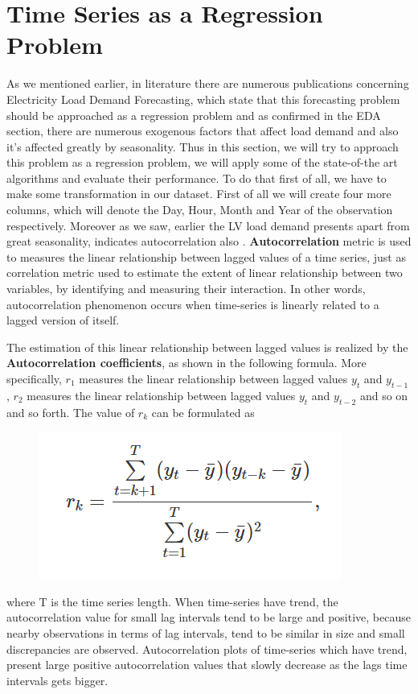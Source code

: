 \section{Time Series as a Regression Problem}
As we mentioned earlier, in literature there are numerous publications concerning Electricity Load Demand Forecasting, which state that this forecasting problem should be approached as a regression problem and as confirmed in the EDA section, there are numerous exogenous factors that affect load demand and also it's affected greatly by seasonality. Thus in this section, we will try to approach this problem as a regression problem, we will apply some of the state-of-the art algorithms and evaluate their performance. To do that first of all, we have to make some transformation in our dataset. First of all we will create four more columns, which will denote the Day, Hour, Month and Year of the observation respectively. Moreover as we saw, earlier the LV load demand presents apart from great seasonality, indicates autocorrelation also \cite{vanderplas2016python}. \textbf{Αutocorrelation} metric is used to measures the linear relationship between lagged values of a time series, just as correlation metric used to estimate the extent of linear relationship between two variables, by identifying and measuring their interaction. In other words, autocorrelation phenomenon occurs when time-series is linearly related to a lagged version of itself.
\par The estimation of this linear relationship between lagged values is realized by the \textbf{Autocorrelation coefficients}, as shown in the following formula. More specifically, $r_{1}$ measures the linear relationship between lagged values $y_{t}$ and $y_{t-1}$, $r_{2}$ measures the linear relationship between lagged values $y_{t}$ and $y_{t-2}$ and so on and so forth. The value of $r_{k}$ can be formulated as
\begin{figure}[h!]
\centering
\includegraphics[width=0.6\linewidth]{project/rk.PNG}
\label{fig:felix}
\end{figure}
where T is the time series length. When time-series have trend, the autocorrelation value for small lag intervals tend to be large and positive, because nearby observations in terms of lag intervals, tend to be similar in size and small discrepancies are observed. Autocorrelation plots of time-series which have trend, present large positive autocorrelation values that slowly decrease as the lags time intervals gets bigger. 
